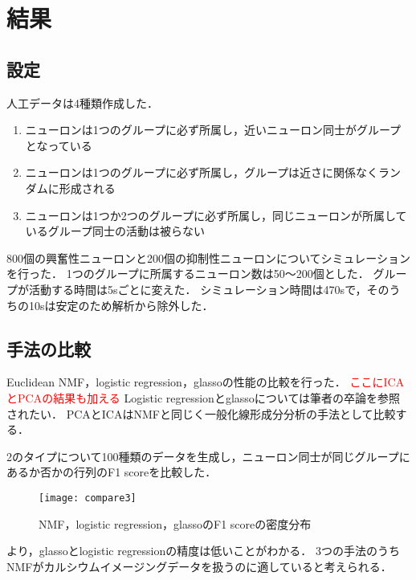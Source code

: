 \section{結果}
\subsection{設定}
人工データは4種類作成した．
\begin{enumerate}
  \item ニューロンは1つのグループに必ず所属し，近いニューロン同士がグループとなっている
  \item ニューロンは1つのグループに必ず所属し，グループは近さに関係なくランダムに形成される
  \item ニューロンは1つか2つのグループに必ず所属し，同じニューロンが所属しているグループ同士の活動は被らない
\end{enumerate}
800個の興奮性ニューロンと200個の抑制性ニューロンについてシミュレーションを行った．
1つのグループに所属するニューロン数は50〜200個とした．
グループが活動する時間は5sごとに変えた．
シミュレーション時間は470sで，そのうちの10sは安定のため解析から除外した．

\subsection{手法の比較}
Euclidean NMF，logistic regression，glassoの性能の比較を行った．
\textcolor{red}{ここにICAとPCAの結果も加える}
Logistic regressionとglassoについては筆者の卒論を参照されたい．
PCAとICAはNMFと同じく一般化線形成分分析の手法\cite{Cichocki2009}として比較する．

2のタイプについて100種類のデータを生成し，ニューロン同士が同じグループにあるか否かの行列のF1 scoreを比較した．
\begin{figure}[htbp]
    \begin{center}
        \texttt{[image: compare3]}
        \caption{NMF，logistic regression，glassoのF1 scoreの密度分布}
        \label{fig:compare3}
    \end{center}
\end{figure}
より，glassoとlogistic regressionの精度は低いことがわかる．
3つの手法のうちNMFがカルシウムイメージングデータを扱うのに適していると考えられる．

